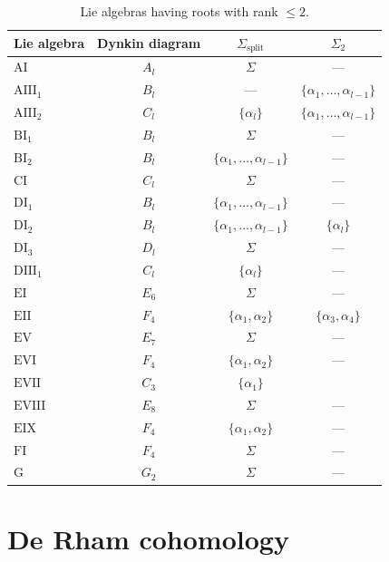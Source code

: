 \documentclass[10pt,a4paper]{amsart}
\numberwithin{equation}{section}
\begin{document}
\begin{table}[h]\centering
\begin{tabular}{|l|c|c|c|}
\hline
Lie algebra & Dynkin diagram & $\Sigma_{\mathrm{split}}$ & $\Sigma_2 $ \\
\hline
$\mathrm{AI}$ & $A_l $ & $\Sigma $ & --- \\ \hline
$\mathrm{AIII_1}$ & $B_l $ & --- & $\{\alpha_{1}, \ldots, \alpha_{l-1} \} $
\\ \hline
$\mathrm{AIII_2}$ & $C_l $ & $\{\alpha_{l} \} $ & $\{\alpha_1, \ldots,
\alpha_{l-1}\}$ \\ \hline
$\mathrm{BI_1} $ & $B_l $ & $\Sigma $ & --- \\ \hline
$\mathrm{BI_2}$ & $B_l $ & $\{\alpha_1,\ldots,\alpha_{l-1}\}$ & --- \\ \hline
$\mathrm{CI}$ & $C_l $ & $\Sigma$ & --- \\ \hline
$\mathrm{DI_1}$ & $B_l $ & $\{\alpha_1, \dots, \alpha_{l-1}\}$ & --- \\ \hline
$\mathrm{DI_2}$ & $B_l $ & $\{\alpha_1, \ldots, \alpha_{l-1}\}$ & $%
\{\alpha_l\}$ \\ \hline
$\mathrm{DI_3}$ & $D_l $ & $\Sigma$ & --- \\ \hline
$\mathrm{DIII_1}$ & $C_l $ & $\{\alpha_l\}$ & --- \\ \hline
$\mathrm{EI}$ & $E_6 $ & $\Sigma$ & --- \\ \hline
$\mathrm{EII}$ & $F_4 $ & $\{\alpha_1,\alpha_2\}$ & $\{\alpha_3,\alpha_4\}$
\\ \hline
$\mathrm{EV}$ & $E_7 $ & $\Sigma$ & --- \\ \hline
$\mathrm{EVI}$ & $F_4 $ & $\{\alpha_1,\alpha_2\}$ & --- \\ \hline
$\mathrm{EVII}$ & $C_3 $ & $\{\alpha_1\}$ & \\ \hline
$\mathrm{EVIII}$ & $E_8 $ & $\Sigma$ & --- \\ \hline
$\mathrm{EIX}$ & $F_4 $ & $\{\alpha_1,\alpha_2\}$ & --- \\ \hline
$\mathrm{FI}$ & $F_4 $ & $\Sigma$ & --- \\ \hline
$\mathrm{G}$ & $G_2 $ & $\Sigma$ & --- \\ \hline
\end{tabular}
\caption{Lie algebras having roots with rank $\leq 2 $.}\label{table}
\end{table}

\section{De Rham cohomology}
\end{document}
